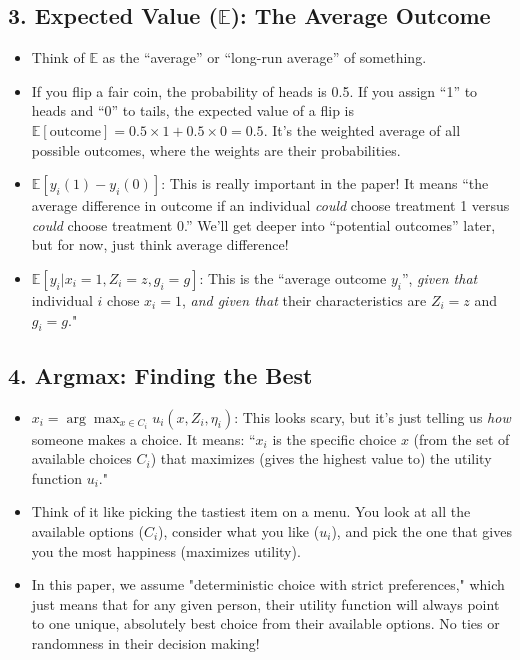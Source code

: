 \documentclass{article}
\newcommand{\E}{\mathbb{E}}
\begin{document}
\subsection*{3. Expected Value ($\E$): The Average Outcome}
\begin{itemize}
    \item Think of $\E$ as the ``average'' or ``long-run average'' of something.
    \item If you flip a fair coin, the probability of heads is 0.5. If you assign ``1'' to heads and ``0'' to tails, the expected value of a flip is $\E[\text{outcome}] = 0.5 \times 1 + 0.5 \times 0 = 0.5$. It's the weighted average of all possible outcomes, where the weights are their probabilities.
    \item $\E[y_i(1) - y_i(0)]$: This is really important in the paper! It means ``the average difference in outcome if an individual \textit{could} choose treatment 1 versus \textit{could} choose treatment 0.'' We'll get deeper into ``potential outcomes'' later, but for now, just think average difference!
    \item $\E[y_i | x_i = 1, Z_i = z, g_i = g]$: This is the ``average outcome $y_i$'', \textit{given that} individual $i$ chose $x_i=1$, \textit{and given that} their characteristics are $Z_i=z$ and $g_i=g$."
\end{itemize}

\subsection*{4. Argmax: Finding the Best}
\begin{itemize}
    \item $x_i = \arg\max_{x \in C_i} u_i(x, Z_i, \eta_i)$: This looks scary, but it's just telling us \textit{how} someone makes a choice. It means: ``$x_i$ is the specific choice $x$ (from the set of available choices $C_i$) that maximizes (gives the highest value to) the utility function $u_i$."

    \item Think of it like picking the tastiest item on a menu. You look at all the available options ($C_i$), consider what you like ($u_i$), and pick the one that gives you the most happiness (maximizes utility).

    \item In this paper, we assume "deterministic choice with strict preferences," which just means that for any given person, their utility function will always point to one unique, absolutely best choice from their available options. No ties or randomness in their decision making!
\end{itemize}
\end{document}
